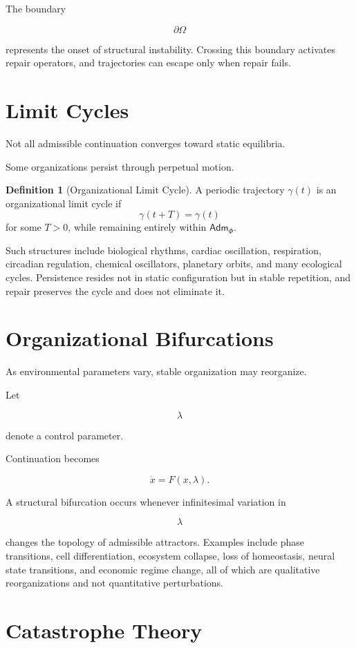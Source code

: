 \documentclass[11pt,oneside]{book}
\numberwithin{equation}{chapter}
\theoremstyle{definition}
\newtheorem{definition}{Definition}[chapter]
\theoremstyle{plain}
\newcommand{\Adm}{\mathsf{Adm}}
\begin{document}
The boundary

\[
\partial\Omega
\]

represents the onset of structural instability. Crossing this boundary activates repair operators, and trajectories can escape only when repair fails.

\section{Limit Cycles}

Not all admissible continuation converges toward static equilibria.

Some organizations persist through perpetual motion.

\begin{definition}[Organizational Limit Cycle]
A periodic trajectory \(\gamma(t)\) is an organizational limit cycle if
\[
\gamma(t+T)
=
\gamma(t)
\]
for some \(T>0\), while remaining entirely within \(\Adm_\Phi\).
\end{definition}

Such structures include biological rhythms, cardiac oscillation, respiration, circadian regulation, chemical oscillators, planetary orbits, and many ecological cycles. Persistence resides not in static configuration but in stable repetition, and repair preserves the cycle and does not eliminate it.

\section{Organizational Bifurcations}

As environmental parameters vary, stable organization may reorganize.

Let

\[
\lambda
\]

denote a control parameter.

Continuation becomes

\[
\dot{x}
=
F(x,\lambda).
\]

A structural bifurcation occurs whenever infinitesimal variation in

\[
\lambda
\]

changes the topology of admissible attractors. Examples include phase transitions, cell differentiation, ecosystem collapse, loss of homeostasis, neural state transitions, and economic regime change, all of which are qualitative reorganizations and not quantitative perturbations.

\section{Catastrophe Theory}
\end{document}
